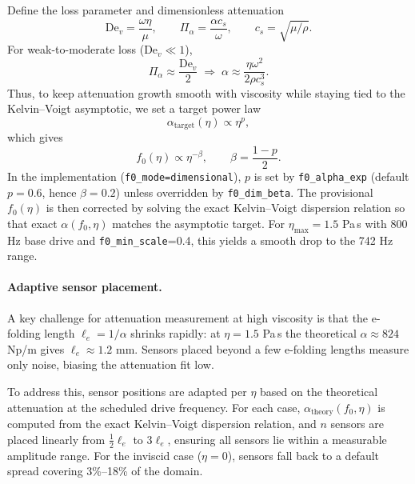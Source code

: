 \documentclass[11pt]{article}
\begin{document}
Define the loss parameter and dimensionless attenuation
\begin{equation}
\mathrm{De}_v=\frac{\omega\eta}{\mu}, \qquad
\Pi_\alpha=\frac{\alpha c_s}{\omega}, \qquad c_s=\sqrt{\mu/\rho}.
\end{equation}
For weak-to-moderate loss (\(\mathrm{De}_v\ll 1\)),
\begin{equation}
\Pi_\alpha \approx \frac{\mathrm{De}_v}{2}
\;\Rightarrow\;
\alpha \approx \frac{\eta \omega^2}{2\rho c_s^3}.
\label{eq:alpha_scaling}
\end{equation}
Thus, to keep attenuation growth smooth with viscosity while staying tied to the Kelvin--Voigt asymptotic, we set a target power law
\begin{equation}
\alpha_{\mathrm{target}}(\eta)\propto \eta^p,
\end{equation}
which gives
\begin{equation}
f_0(\eta)\propto \eta^{-\beta}, \qquad \beta=\frac{1-p}{2}.
\end{equation}
In the implementation (\texttt{f0\_mode=dimensional}), \(p\) is set by \texttt{f0\_alpha\_exp} (default \(p=0.6\), hence \(\beta=0.2\)) unless overridden by \texttt{f0\_dim\_beta}. The provisional \(f_0(\eta)\) is then corrected by solving the exact Kelvin--Voigt dispersion relation so that exact \(\alpha(f_0,\eta)\) matches the asymptotic target. For \(\eta_{\max}=1.5\) Pa\,s with 800 Hz base drive and \texttt{f0\_min\_scale}=0.4, this yields a smooth drop to the 742 Hz range.

\paragraph{Adaptive sensor placement.}
A key challenge for attenuation measurement at high viscosity is that the e-folding length \(\ell_e=1/\alpha\) shrinks rapidly: at \(\eta=1.5\) Pa\,s the theoretical \(\alpha\approx 824\) Np/m gives \(\ell_e\approx 1.2\) mm. Sensors placed beyond a few e-folding lengths measure only noise, biasing the attenuation fit low.

To address this, sensor positions are adapted per \(\eta\) based on the theoretical attenuation at the scheduled drive frequency. For each case, \(\alpha_{\mathrm{theory}}(f_0,\eta)\) is computed from the exact Kelvin--Voigt dispersion relation, and \(n\) sensors are placed linearly from \(\tfrac{1}{2}\ell_e\) to \(3\ell_e\), ensuring all sensors lie within a measurable amplitude range. For the inviscid case (\(\eta=0\)), sensors fall back to a default spread covering 3\%--18\% of the domain.
\end{document}
